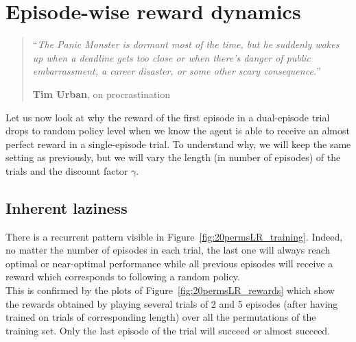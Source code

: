 \chapter{Episode-wise reward dynamics}
\label{chap:reward_structure}
\begin{quotation}
\noindent ``\emph{The Panic Monster is dormant most of the time, but he 
	suddenly wakes up when a deadline gets too close or when there's danger
	of public embarrassment, a career disaster, or some other scary 
	consequence.}''
\begin{flushright}\textbf{Tim Urban}, on procrastination\end{flushright}
\end{quotation}
\vspace*{0.5cm}

Let us now look at why the reward of the first episode in a dual-episode
trial drops to random policy level when we know the agent is able to receive
an almost perfect reward in a single-episode trial. To understand why, we will
keep the same setting as previously, but
we will vary the length (in number of episodes) of the trials and the
discount factor $\gamma$.

\section{Inherent laziness}
There is a recurrent pattern visible in Figure~\ref{fig:20permsLR_training}.
Indeed, no matter the number of episodes in each trial, the last one will
always reach optimal or near-optimal performance while all previous episodes
will receive a reward which corresponds to following a random policy.\\

This is confirmed by the plots of Figure~\ref{fig:20permsLR_rewards} which
show the rewards obtained by playing several trials of 2 and 5 episodes
(after having trained on trials of corresponding length) over all the
permutations of the training set. Only the last episode of the trial will
succeed or almost succeed.\\


